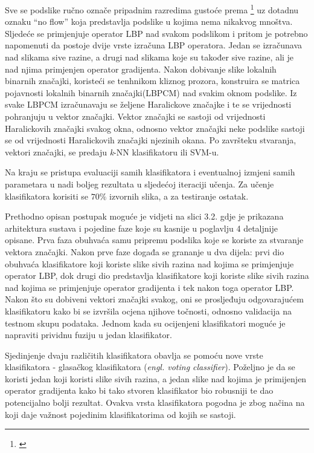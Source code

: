 \documentclass[times, utf8, zavrsni]{fer}
\begin{document}
Sve se podslike ručno označe pripadnim razredima gustoće prema
\footnote{\cite{polus}} uz dotadnu oznaku \enquote{no flow} koja 
predstavlja podslike u kojima nema nikakvog mnoštva. Sljedeće se primjenjuje
operator LBP nad svakom podslikom i pritom je potrebno napomenuti da
 postoje dvije vrste izračuna LBP operatora. Jedan se izračunava nad slikama 
sive razine, a drugi nad slikama koje su također sive razine, ali je nad njima 
primjenjen operator gradijenta. Nakon dobivanje slike lokalnih binarnih 
značajki, koristeći se tenhnikom kliznog prozora, konstruira se matrica 
pojavnosti lokalnih binarnih značajki(LBPCM) nad svakim oknom podslike. 
Iz svake LBPCM izračunavaju se željene Haralickove značajke i te se vrijednosti
pohranjuju u vektor značajki. Vektor značajki se sastoji od vrijednosti
Haralickovih značajki svakog okna, odnosno vektor značajki neke podslike 
sastoji se od vrijednosti Haralickovih značajki njezinih okana. Po završteku 
stvaranja, vektori značajki, se predaju \textit{k}-NN klasifikatoru ili SVM-u.

\bigbreak

Na kraju se pristupa evaluaciji samih klasifikatora i eventualnoj izmjeni
samih parametara u nadi boljeg rezultata u sljedećoj iteraciji učenja. Za učenje
klasifikatora korisiti se \(70\%\) izvornih slika, a za testiranje ostatak.

\newpage

Prethodno opisan postupak moguće je vidjeti na slici 3.2. gdje je
prikazana arhitektura sustava i pojedine faze koje su kasnije u poglavlju 4 
detaljnije opisane. Prva faza obuhvaća samu pripremu podslika koje se 
koriste za stvaranje vektora značajki. Nakon prve faze događa se grananje
u dva dijela: prvi dio obuhvaća klasifikatore koji koriste slike sivih razina 
nad kojima se primjenjuje operator LBP, dok drugi dio predstavlja klasifikatore
koji koriste slike sivih razina nad kojima se primjenjuje operator gradijenta
i tek nakon toga operator LBP. Nakon što su dobiveni vektori značajki 
svakog, oni se prosljeđuju odgovarajućem klasifikatoru kako bi se izvršila
ocjena njihove točnosti, odnosno validacija na testnom skupu podataka.
Jednom kada su ocijenjeni klasifikatori moguće je napraviti prividnu 
fuziju u jedan klasifikator.

\bigbreak

Sjedinjenje dvaju različitih klasifikatora obavlja se pomoću nove vrste
klasifikatora - glasačkog klasifikatora (\textit{engl. voting classifier}).
Poželjno je da se koristi jedan koji koristi slike sivih razina, a jedan 
slike nad kojima je primijenjen operator gradijenta kako bi tako
stvoren klasifikator bio robusniji te dao potencijalno bolji rezultat.
Ovakva vrsta klasifikatora pogodna je zbog načina na koji daje važnost pojedinim
klasifikatorima od kojih se sastoji. 
\end{document}
